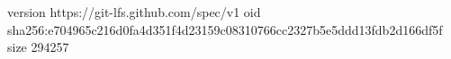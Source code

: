 version https://git-lfs.github.com/spec/v1
oid sha256:e704965c216d0fa4d351f4d23159c08310766cc2327b5e5ddd13fdb2d166df5f
size 294257
